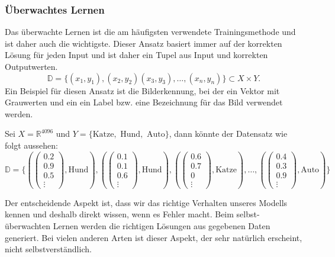 \documentclass[12pt,letterpaper,ngerman]{article}
\begin{document}
\subsubsection{Überwachtes Lernen}
Das überwachte Lernen ist die am häufigsten verwendete Trainingsmethode
und ist daher auch die wichtigste. Dieser Ansatz basiert immer auf der
korrekten Lösung für jeden Input und ist daher ein Tupel aus Input und
korrekten Outputwerten. 
  \[\mathbb{D} = \{ (x_1,y_1), (x_2,y_2) (x_3,y_3), \dots ,(x_n,y_n)\} 
  \subset X \times Y.\]
Ein Beispiel für diesen Ansatz ist die Bilderkennung, bei der ein Vektor
mit Grauwerten und ein ein Label bzw. eine Bezeichnung für das Bild
verwendet werden.
\begin{example}
  Sei $X = \mathbb{R}^{4096}$ und
   $Y = \{ \text{Katze}, \text{ Hund}, \text{ Auto}\}$, dann könnte der 
   Datensatz wie folgt aussehen:
   \[
     \mathbb{D} = \{
     (\begin{pmatrix} 0.2 \\ 0.9 \\ 0.5 \\ \vdots \end{pmatrix}, \text{Hund}),
     (\begin{pmatrix} 0.1 \\ 0.1 \\ 0.6 \\ \vdots \end{pmatrix}, \text{Hund}),
     (\begin{pmatrix} 0.6 \\ 0.7 \\ 0 \\ \vdots \end{pmatrix}, \text{Katze}),
     \dots, 
     (\begin{pmatrix} 0.4 \\ 0.3 \\ 0.9 \\ \vdots \end{pmatrix}, \text{Auto})
    \}
   \]
\end{example}
Der entscheidende Aspekt ist, dass wir das richtige Verhalten unseres Modells 
kennen und deshalb direkt wissen, wenn es Fehler macht. Beim selbst-überwachten
Lernen werden die richtigen Lösungen aus gegebenen Daten generiert. 
Bei vielen anderen Arten ist dieser Aspekt, der sehr natürlich erscheint,
nicht selbstverständlich.
\end{document}
